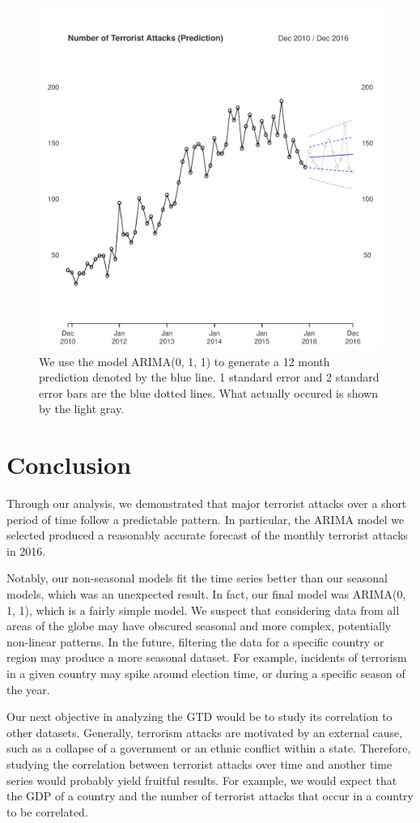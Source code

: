 \documentclass[11pt]{paper}
\begin{document}
\begin{figure}
\centering
\includegraphics[width=0.75\linewidth]{../image/prediction_on_testing.pdf}
\caption{We use the model ARIMA(0, 1, 1) to generate a 12 month prediction denoted by the blue line. 1 standard error and 2 standard error bars are the blue dotted lines. What actually occured is shown by the light gray.}
\label{prediction}
\end{figure}


\section{Conclusion}
Through our analysis, we demonstrated that major terrorist attacks over a short period of time follow a predictable pattern. In particular, the ARIMA model we selected produced a reasonably accurate forecast of the monthly terrorist attacks in 2016.

Notably, our non-seasonal models fit the time series better than our seasonal models, which was an unexpected result. In fact, our final model was ARIMA(0, 1, 1), which is a fairly simple model. We suspect that considering data from all areas of the globe may have obscured seasonal and more complex, potentially non-linear patterns. In the future, filtering the data for a specific country or region may produce a more seasonal dataset. For example, incidents of terrorism in a given country may spike around election time, or during a specific season of the year.

Our next objective in analyzing the GTD would be to study its correlation to other datasets. Generally, terrorism attacks are motivated by an external cause, such as a collapse of a government or an ethnic conflict within a state. Therefore, studying the correlation between terrorist attacks over time and another time series would probably yield fruitful results. For example, we would expect that the GDP of a country and the number of terrorist attacks that occur in a country to be correlated.
\end{document}
